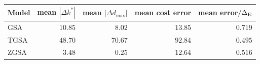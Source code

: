 \begin{tabular}{@{}lrrrr@{}}
  \toprule
  Model & mean $|\Delta k^*|$ & mean $|\Delta d_{\max}|$ & mean cost error & mean error$/\Delta_{\rm E}$ \\
  \midrule
  GSA & $10.85$ & $8.02$ & $13.85$ & $0.719$ \\
  TGSA & $48.70$ & $70.67$ & $92.84$ & $0.495$ \\
  ZGSA & $3.48$ & $0.25$ & $12.64$ & $0.516$ \\
  \bottomrule
\end{tabular}
